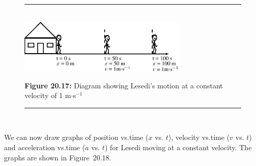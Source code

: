     \setcounter{subfigure}{0}


	\begin{figure}[H] %
    \begin{center}
    \rule[.1in]{\figurerulewidth}{.005in} \\
        \label{m38795*uid91!!!underscore!!!media}\label{m38795*uid91!!!underscore!!!printimage}\includegraphics[width=300px]{col11305.imgs/m38795_PG10C2_022.png} %
        
      \vspace{2pt}
    \vspace{\rubberspace}\par \begin{cnxcaption}
	  \small \textbf{Figure 20.17: }Diagram showing Lesedi's motion at a constant velocity of 1 m\begin{math}\ensuremath{\cdot}\end{math}s\begin{math}{}^{-1}\end{math}
	\end{cnxcaption}
      
    \vspace{.1in}
    \rule[.1in]{\figurerulewidth}{.005in} \\
        
    \end{center}

 \end{figure}   

    \addtocounter{footnote}{-0}
    
        \label{m38795*id70106}We can now draw graphs of position vs.time (\begin{math}x\end{math} vs. \begin{math}t\end{math}), velocity vs.time (\begin{math}v\end{math} vs. \begin{math}t\end{math}) and acceleration vs.time (\begin{math}a\end{math} vs. \begin{math}t\end{math}) for Lesedi moving at a constant velocity. The graphs are shown in Figure~20.18.\par 
        
